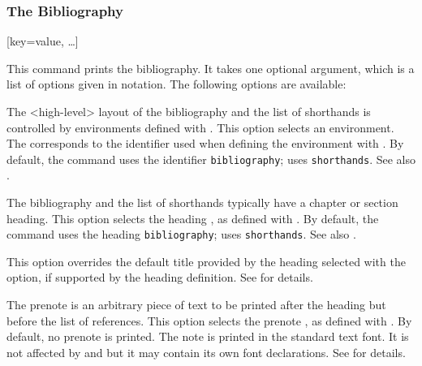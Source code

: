 \documentclass{ltxdockit}[2011/03/25]
\begin{document}
\begin{ltxsyntax}
\subsubsection{The Bibliography}
\label{use:bib:bib}

[key=value, \dots]

This command prints the bibliography. It takes one optional argument, which is a list of options given in \keyval notation. The following options are available:

\end{ltxsyntax}

\begin{optionlist*}


The <high-level> layout of the bibliography and the list of shorthands is controlled by environments defined with . This option selects an environment. The  corresponds to the identifier used when defining the environment with . By default, the  command uses the identifier \texttt{bibliography};  uses \texttt{shorthands}. See also .


The bibliography and the list of shorthands typically have a chapter or section heading. This option selects the heading , as defined with . By default, the  command uses the heading \texttt{bibliography};  uses \texttt{shorthands}. See also .


This option overrides the default title provided by the heading selected with the  option, if supported by the heading definition. See  for details.


The prenote is an arbitrary piece of text to be printed after the heading but before the list of references. This option selects the prenote , as defined with . By default, no prenote is printed. The note is printed in the standard text font. It is not affected by  and  but it may contain its own font declarations. See  for details.


\end{optionlist*}
\end{document}
